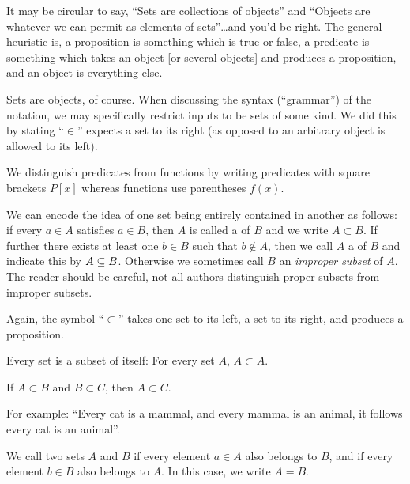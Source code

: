 \begin{remark}
It may be circular to say, ``Sets are collections of objects'' and
``Objects are whatever we can permit as elements of sets''\dots and
you'd be right. The general heuristic is, a proposition is something
which is true or false, a predicate is something which takes an object
[or several objects] and produces a proposition, and an object is
everything else.
\end{remark}

\begin{remark}
Sets are objects, of course. When discussing the syntax (``grammar'') of
the notation, we may specifically restrict inputs to be sets of some kind.
We did this by stating ``$\in$'' expects a set to its right (as opposed
to an arbitrary object is allowed to its left).
\end{remark}

 We distinguish predicates from functions by writing
predicates with square brackets $P[x]$ whereas functions use parentheses
$f(x)$. 

We can encode the idea of one set being entirely contained in another as
follows: if every $a\in A$ satisfies $a\in B$, then $A$ is called a
 of $B$ and we write $A\subset B$. If further there
exists at least one $b\in B$ such that $b\notin A$, then we call $A$ a
 of $B$ and indicate this by $A\propersubset B$.
Otherwise we sometimes call $B$ an \emph{improper subset} of $A$. The
reader should be careful, not all authors distinguish proper subsets
from improper subsets.

Again, the symbol ``$\subset$'' takes one set to its left, a set to its
right, and produces a proposition.

\begin{theorem}
Every set is a subset of itself: For every set $A$, $A\subset A$.
\end{theorem}

\begin{theorem}
If $A\subset B$ and $B\subset C$, then $A\subset C$.
\end{theorem}

For example: ``Every cat is a mammal, and every mammal is an animal, it
follows every cat is an animal''.

We call two sets $A$ and $B$  if every element $a\in A$
also belongs to $B$, and if every element $b\in B$ also belongs to $A$.
In this case, we write $A=B$.

